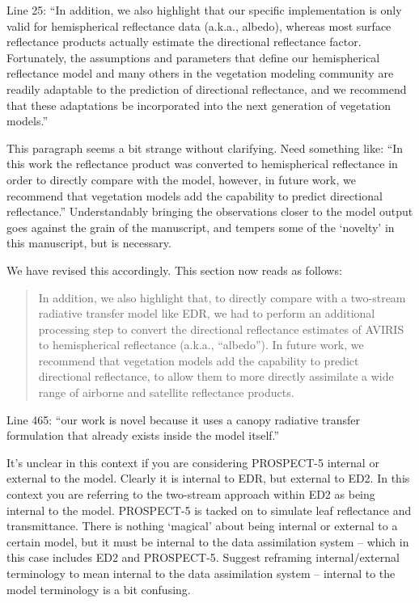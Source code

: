 \documentclass{article}
\newenvironment{reviewer}{\par\color{Mahogany}\vspace{6pt}}{\par\vspace{6pt}}
\begin{document}
\begin{reviewer}
  Line 25: ``In addition, we also highlight that our specific implementation is only valid for hemispherical reflectance data (a.k.a., albedo), whereas most surface reflectance products actually estimate the directional reflectance factor. Fortunately, the assumptions and parameters that define our hemispherical reflectance model and many others in the vegetation modeling community are readily adaptable to the prediction of directional reflectance, and we recommend that these adaptations be incorporated into the next generation of vegetation models.''

  This paragraph seems a bit strange without clarifying. Need something like: ``In this work the reflectance product was converted to hemispherical reflectance in order to directly compare with the model, however, in future work, we recommend that vegetation models add the capability to predict directional reflectance.''
  Understandably bringing the observations closer to the model output goes against the grain of the manuscript, and tempers some of the ‘novelty’ in this manuscript, but is necessary.
\end{reviewer}

We have revised this accordingly.
This section now reads as follows:

\begin{quote}
  In addition, we also highlight that, to directly compare with a two-stream radiative transfer model like EDR, we had to perform an additional processing step to convert the directional reflectance estimates of AVIRIS to hemispherical reflectance (a.k.a., ``albedo'').
  In future work, we recommend that vegetation models add the capability to predict directional reflectance, to allow them to more directly assimilate a wide range of airborne and satellite reflectance products.
\end{quote}

\begin{reviewer}
  Line 465: “our work is novel because it uses a canopy radiative transfer formulation that already exists inside the model itself.”

  It’s unclear in this context if you are considering PROSPECT-5 internal or external to the model. Clearly it is internal to EDR, but external to ED2. In this context you are referring to the two-stream approach within ED2 as being internal to the model. PROSPECT-5 is tacked on to simulate leaf reflectance and transmittance. There is nothing ‘magical’ about being internal or external to a certain model, but it must be internal to the data assimilation system – which in this case includes ED2 and PROSPECT-5. Suggest reframing internal/external terminology to mean internal to the data assimilation system – internal to the model terminology is a bit confusing.
\end{reviewer}
\end{document}
